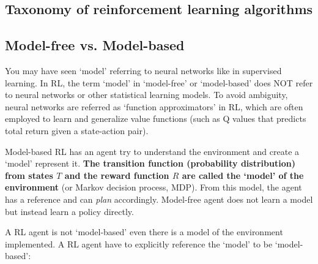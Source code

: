 \documentclass[lang=en,mode=normal,device=normal,color=blue,12pt]{elegantnote}
\DeclareMathOperator*{\1}{\mathbbm{1}}
\begin{document}
\newpage
\begin{appendices}

\section{Taxonomy of reinforcement learning algorithms}

\subsection{Model-free vs. Model-based}
\label{appendix:model-dep}

You may have seen `model' referring to neural networks like in supervised learning.
In RL, the term `model' in `model-free' or `model-based' does NOT refer to neural networks or other statistical learning models.
To avoid ambiguity, neural networks are referred as `function approximators' in RL, which are often employed to learn and generalize value functions (such as Q values that predicts total return given a state-action pair).

Model-based RL has an agent try to understand the environment and create a `model' represent it.
\textbf{The transition function (probability distribution) from states $T$ and the reward function $R$ are called the `model' of the environment} (or Markov decision process, MDP).
From this model, the agent has a reference and can \textit{plan} accordingly. Model-free agent does not learn a model but instead learn a policy directly.

A RL agent is not `model-based' even there is a model of the environment implemented. A RL agent have to explicitly reference the `model' to be `model-based':


\end{appendices}
\end{document}
